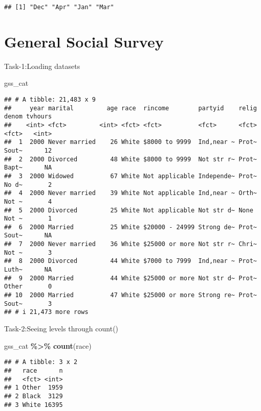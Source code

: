\documentclass[
]{article}
\newenvironment{Shaded}{\begin{snugshade}}{\end{snugshade}}
\newcommand{\FunctionTok}[1]{\textcolor[rgb]{0.13,0.29,0.53}{\textbf{#1}}}
\newcommand{\NormalTok}[1]{#1}
\newcommand{\SpecialCharTok}[1]{\textcolor[rgb]{0.81,0.36,0.00}{\textbf{#1}}}
\begin{document}
\begin{verbatim}
## [1] "Dec" "Apr" "Jan" "Mar"
\end{verbatim}

\hypertarget{general-social-survey}{%
\section{General Social Survey}\label{general-social-survey}}

Task-1:Loading datasets

\begin{Shaded}
\begin{Highlighting}[]
\NormalTok{gss\_cat}
\end{Highlighting}
\end{Shaded}

\begin{verbatim}
## # A tibble: 21,483 x 9
##     year marital         age race  rincome        partyid    relig denom tvhours
##    <int> <fct>         <int> <fct> <fct>          <fct>      <fct> <fct>   <int>
##  1  2000 Never married    26 White $8000 to 9999  Ind,near ~ Prot~ Sout~      12
##  2  2000 Divorced         48 White $8000 to 9999  Not str r~ Prot~ Bapt~      NA
##  3  2000 Widowed          67 White Not applicable Independe~ Prot~ No d~       2
##  4  2000 Never married    39 White Not applicable Ind,near ~ Orth~ Not ~       4
##  5  2000 Divorced         25 White Not applicable Not str d~ None  Not ~       1
##  6  2000 Married          25 White $20000 - 24999 Strong de~ Prot~ Sout~      NA
##  7  2000 Never married    36 White $25000 or more Not str r~ Chri~ Not ~       3
##  8  2000 Divorced         44 White $7000 to 7999  Ind,near ~ Prot~ Luth~      NA
##  9  2000 Married          44 White $25000 or more Not str d~ Prot~ Other       0
## 10  2000 Married          47 White $25000 or more Strong re~ Prot~ Sout~       3
## # i 21,473 more rows
\end{verbatim}

Task-2:Seeing levels through count()

\begin{Shaded}
\begin{Highlighting}[]
\NormalTok{gss\_cat }\SpecialCharTok{\%\textgreater{}\%}
  \FunctionTok{count}\NormalTok{(race)}
\end{Highlighting}
\end{Shaded}

\begin{verbatim}
## # A tibble: 3 x 2
##   race      n
##   <fct> <int>
## 1 Other  1959
## 2 Black  3129
## 3 White 16395
\end{verbatim}
\end{document}
